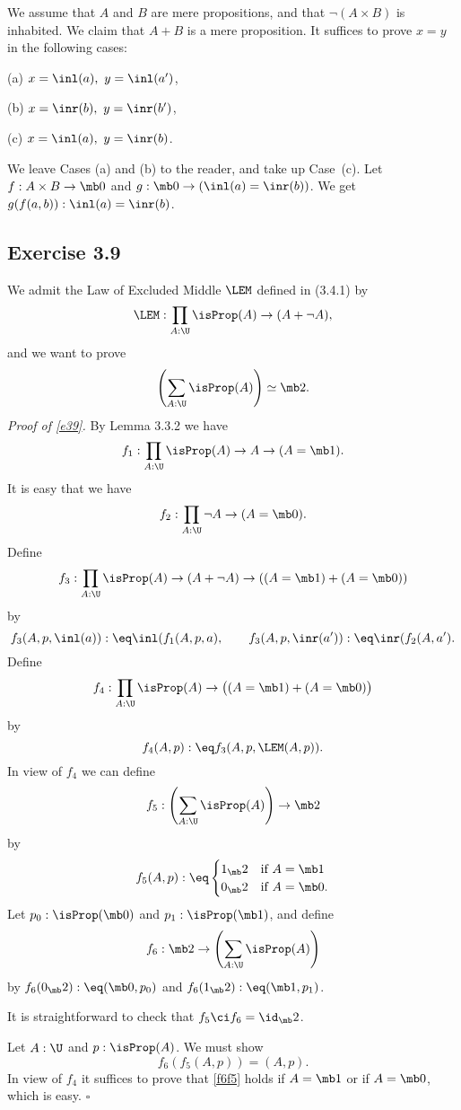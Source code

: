 \documentclass[12pt]{article}
\begin{document}
We assume that $A$ and $B$ are mere propositions, and that $\neg(A\times B)$ is inhabited. We claim that $A+B$ is a mere proposition. It suffices to prove $x=y$ in the following cases:

(a) $x=\inl(a),\ y=\inl(a')$,

(b) $x=\inr(b),\ y=\inr(b')$,

(c) $x=\inl(a),\ y=\inr(b)$.

\nn We leave Cases (a) and (b) to the reader, and take up Case~(c). Let $f:A\times B\to\mb0$ and $g:\mb0\to(\inl(a)=\inr(b))$. We get $g(f(a,b)):\inl(a)=\inr(b)$.


\subsection{Exercise 3.9}

We admit the Law of Excluded Middle $\LEM$ defined in (3.4.1) by 
$$
\LEM:\prod_{A:\U}\isProp(A)\to(A+\neg A),
$$ 
and we want to prove 
\begin{equation}\label{e39}
\left(\sum_{A:\U}\isProp(A)\right)\simeq\mb2.
\end{equation}
\emph{Proof of \eqref{e39}.} By Lemma 3.3.2 we have 
$$
f_1:\prod_{A:\U}\isProp(A)\to A\to(A=\mb1). 
$$ 
It is easy that we have 
$$
f_2:\prod_{A:\U}\neg A\to(A=\mb0). 
$$ 
Define 
$$
f_3:\prod_{A:\U}\isProp(A)\to(A+\neg A)\to((A=\mb1)+(A=\mb0))
$$ 
by 
$$
f_3(A,p,\inl(a)):\eq\inl(f_1(A,p,a),\qquad f_3(A,p,\inr(a')):\eq\inr(f_2(A,a').
$$ 
Define 
$$
f_4:\prod_{A:\U}\isProp(A)\to\big((A=\mb1)+(A=\mb0)\big)
$$ 
by 
$$
f_4(A,p):\eq f_3(A,p,\LEM(A,p)).
$$ 
In view of $f_4$ we can define 
$$
f_5:\left(\sum_{A:\U}\isProp(A)\right)\to\mb2
$$ 
by 
$$
f_5(A,p):\eq
\begin{cases}
1_\mb2&\text{if }A=\mb1\\
0_\mb2&\text{if }A=\mb0.
\end{cases}
$$ 
Let $p_0:\isProp(\mb0)$ and $p_1:\isProp(\mb1)$, and define 
$$
f_6:\mb2\to\left(\sum_{A:\U}\isProp(A)\right)
$$ 
by $f_6(0_\mb2):\eq(\mb0,p_0)$ and $f_6(1_\mb2):\eq(\mb1,p_1)$.

It is straightforward to check that $f_5\ci f_6=\id_\mb2$. 

Let $A:\U$ and $p:\isProp(A)$. We must show 
\begin{equation}\label{f6f5}
f_6(f_5(A,p))=(A,p).
\end{equation}
In view of $f_4$ it suffices to prove that \eqref{f6f5} holds if $A=\mb1$ or if $A=\mb0$, which is easy. $\square$ 
\end{document}
